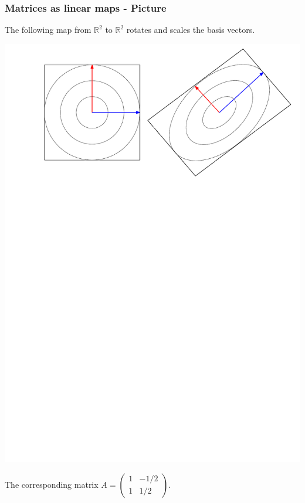 \documentclass[12pt]{beamer}
\newcommand{\RR}{\ensuremath{\mathbb{R}}}
\theoremstyle{definition}
\begin{document}
\begin{frame}
\frametitle{Matrices as linear maps - Picture}
The following map from $\RR^2$ to $\RR^2$ rotates
and scales the basis vectors.

\centerline{\includegraphics[width=.8\textwidth]{matr-pic.pdf}}

The corresponding matrix $A = \left( \begin{array}{cc}  1 & -1/2 \\ 1 & 1/2 \end{array} \right)$.
\end{frame}
\end{document}

